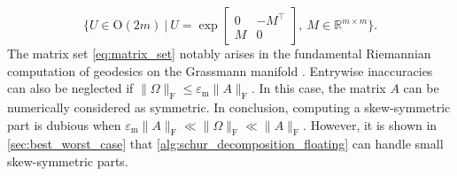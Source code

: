\documentclass[10pt,twoside,dvipsnames]{siamart1116}
\numberwithin{algorithm}{section}
\numberwithin{equation}{section}
\begin{document}
	\begin{equation}\label{eq:matrix_set}
	\{U\in\mathrm{O}(2m)\ | \ U = \exp\left[\begin{smallmatrix}
		0&-M^\top \\
		M&0
		\end{smallmatrix}\right],\ M\in\mathbb{R}^{m\times m}\}.
	\end{equation}
	The matrix set \eqref{eq:matrix_set} notably arises in the fundamental Riemannian computation of geodesics on the Grassmann manifold \cite{bendokat2024}. Entrywise inaccuracies can also be neglected if $\|\Omega\|_\mathrm{F}\leq \varepsilon_\mathrm{m} \|A\|_\mathrm{F}$. In this case, the matrix $A$ can be numerically considered as symmetric. In conclusion, computing a skew-symmetric part is dubious when $\varepsilon_\mathrm{m}\|A\|_\mathrm{F}\ll \|\Omega\|_\mathrm{F}\ll\|A\|_\mathrm{F}$. However, it is shown in \cref{sec:best_worst_case} that \cref{alg:schur_decomposition_floating} can handle small skew-symmetric parts.
	
\end{document}
